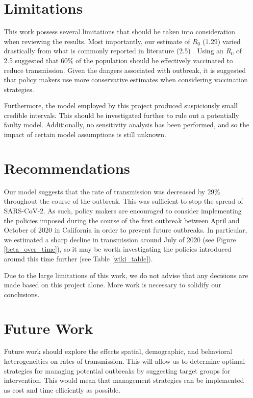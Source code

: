 \documentclass[11pt]{article}
\begin{document}
\section{Limitations}
    This work possess several limitations that should be taken into consideration when reviewing the results.
    Most importantly, our estimate of $R_0$ (1.29) varied drastically from what is commonly reported in literature (2.5) 
    \cite{davies_age-dependent_2020}. Using an $R_0$ of 2.5 suggested that 60\% of the population should be effectively 
    vaccinated to reduce transmission. Given the dangers associated with outbreak, it is suggested that policy makers
    use more conservative estimates when considering vaccination strategies.

    Furthermore, the model employed by this project produced suspiciously small credible intervals.  This
    should be investigated further to rule out a potentially faulty model.  Additionally, no sensitivity analysis has
    been performed, and so the impact of certain model assumptions is still unknown.

\section{Recommendations}
    Our model suggests that the rate of transmission was decreased by 29\% throughout the course of the outbreak.
    This was sufficient to stop the spread of SARS-CoV-2. As such, policy makers are encouraged to consider implementing 
    the policies imposed during the course of the first outbreak between April and October of 2020 in California in order to
    prevent future outbreaks. In particular, we estimated a sharp decline in transmission around July of 2020 (see Figure 
    \ref{beta_over_time}), so it may be worth investigating the policies introduced around this time further (see Table 
    \ref{wiki_table}).

    Due to the large limitations of this work, we do not advise that any decisions are made based on this project alone.
    More work is necessary to solidify our conclusions.

\section{Future Work}
    Future work should explore the effects spatial, demographic, and behavioral heterogeneities on rates of transmission.
    This will allow us to determine optimal strategies for managing potential outbreaks by suggesting target groups for
    intervention. This would mean that management strategies can be implemented as cost and time efficiently as possible.
\end{document}
